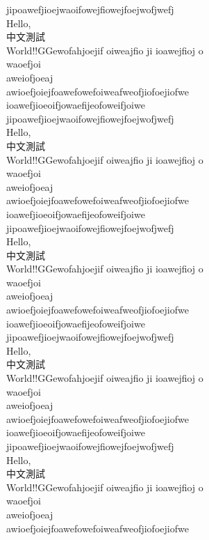 \documentclass[12pt]{article}
\begin{document}
jipoawefjioejwaoifowejfiowejfoejwofjwefj\\Hello, \\中文測試\\World!!GGewofahjoejif oiweajfio ji ioawejfioj o\\
waoefjoi\\
aweiofjoeaj\\
awioefjoiejfoawefowefoiweafweofjiofoejiofwe\\
ioawefjioeoifjowaefijeofoweifjoiwe\\
jipoawefjioejwaoifowejfiowejfoejwofjwefj\\Hello, \\中文測試\\World!!GGewofahjoejif oiweajfio ji ioawejfioj o\\
waoefjoi\\
aweiofjoeaj\\
awioefjoiejfoawefowefoiweafweofjiofoejiofwe\\
ioawefjioeoifjowaefijeofoweifjoiwe\\
jipoawefjioejwaoifowejfiowejfoejwofjwefj\\Hello, \\中文測試\\World!!GGewofahjoejif oiweajfio ji ioawejfioj o\\
waoefjoi\\
aweiofjoeaj\\
awioefjoiejfoawefowefoiweafweofjiofoejiofwe\\
ioawefjioeoifjowaefijeofoweifjoiwe\\
jipoawefjioejwaoifowejfiowejfoejwofjwefj\\Hello, \\中文測試\\World!!GGewofahjoejif oiweajfio ji ioawejfioj o\\
waoefjoi\\
aweiofjoeaj\\
awioefjoiejfoawefowefoiweafweofjiofoejiofwe\\
ioawefjioeoifjowaefijeofoweifjoiwe\\
jipoawefjioejwaoifowejfiowejfoejwofjwefj\\Hello, \\中文測試\\World!!GGewofahjoejif oiweajfio ji ioawejfioj o\\
waoefjoi\\
aweiofjoeaj\\
awioefjoiejfoawefowefoiweafweofjiofoejiofwe\\
\end{document}

